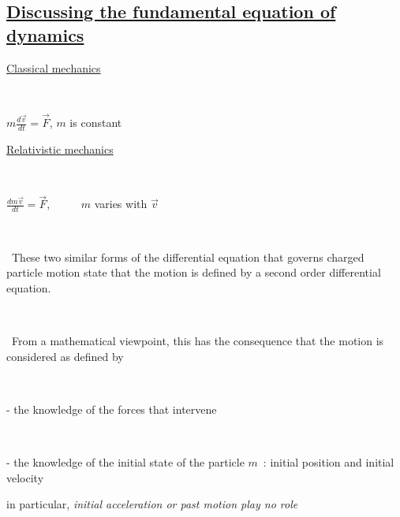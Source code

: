 \documentclass[12pt]{paper}
\newcommand{\F}{\ensuremath{\vec F}}
\newcommand{\nin}{\noindent}
\newcommand{\vv}{\ensuremath{\vec v}}
\newcommand{\blue}{\color{blue}}
\begin{document}
\clearpage

\subsection*{\Large \underline{Discussing the fundamental equation of dynamics}}


\begin{minipage}[b]{.49\linewidth}
\centering
\Large

\blue 

\underline{Classical mechanics}

~

$m \frac{ \textstyle{d\vv}}{\textstyle{dt}} = \F $, $m$ is constant

\end{minipage}
\hspace{.01\linewidth}
\begin{minipage}[b]{.49\linewidth}
\centering
\Large

\blue 

\underline{Relativistic mechanics}


~

$\frac{ \textstyle{dm\vv}}{\textstyle{dt}} = \F $, ~ ~   ~ $m$ varies with $\vv$


\end{minipage}

~

\nin\ These two similar forms of the differential equation that governs charged particle motion state that the motion is 
defined by a second order differential equation. 

~


\nin\  From a mathematical viewpoint, this has the consequence that the motion is considered as defined by 


~

- the knowledge of the forces that intervene

~

-  the knowledge of the initial state of the particle $m$~: initial position and initial velocity~

in particular,   \textsl{initial acceleration or past motion play no role} 

~
\end{document}
